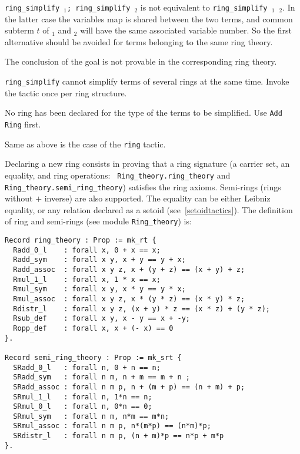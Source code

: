 \Warning \texttt{ring\_simplify \term$_1$; ring\_simplify \term$_2$} is
not equivalent to \texttt{ring\_simplify \term$_1$ \term$_2$}. In the
latter case the variables map is shared between the two terms, and
common subterm $t$ of \term$_1$ and \term$_2$ will have the same
associated variable number. So the first alternative should be
avoided for terms belonging to the same ring theory.


\begin{ErrMsgs}
\item {}
  The conclusion of the goal is not provable in the corresponding ring
  theory.
\item {}
  {\tt ring\_simplify} cannot simplify terms of several rings at the
  same time. Invoke the tactic once per ring structure.
\item {}
  No ring has been declared for the type of the terms to be
  simplified. Use {\tt Add Ring} first.
\item {}
  Same as above is the case of the {\tt ring} tactic.
\end{ErrMsgs}


Declaring a new ring consists in proving that a ring signature (a
carrier set, an equality, and ring operations: {\tt
Ring\_theory.ring\_theory} and {\tt Ring\_theory.semi\_ring\_theory})
satisfies the ring axioms. Semi-rings (rings without $+$ inverse) are
also supported. The equality can be either Leibniz equality, or any
relation declared as a setoid (see~\ref{setoidtactics}). The definition
of ring and semi-rings (see module {\tt Ring\_theory}) is:
\begin{verbatim}
Record ring_theory : Prop := mk_rt {
  Radd_0_l    : forall x, 0 + x == x;
  Radd_sym    : forall x y, x + y == y + x;
  Radd_assoc  : forall x y z, x + (y + z) == (x + y) + z;
  Rmul_1_l    : forall x, 1 * x == x;
  Rmul_sym    : forall x y, x * y == y * x;
  Rmul_assoc  : forall x y z, x * (y * z) == (x * y) * z;
  Rdistr_l    : forall x y z, (x + y) * z == (x * z) + (y * z);
  Rsub_def    : forall x y, x - y == x + -y;
  Ropp_def    : forall x, x + (- x) == 0
}.

Record semi_ring_theory : Prop := mk_srt {
  SRadd_0_l   : forall n, 0 + n == n;
  SRadd_sym   : forall n m, n + m == m + n ;
  SRadd_assoc : forall n m p, n + (m + p) == (n + m) + p;
  SRmul_1_l   : forall n, 1*n == n;
  SRmul_0_l   : forall n, 0*n == 0;
  SRmul_sym   : forall n m, n*m == m*n;
  SRmul_assoc : forall n m p, n*(m*p) == (n*m)*p;
  SRdistr_l   : forall n m p, (n + m)*p == n*p + m*p
}.
\end{verbatim}

